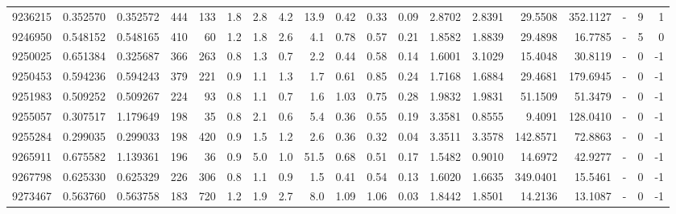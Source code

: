 \begin{tabular}{rrrrrrrrrrrrrrrrlrr}
   9236215 & 0.352570 &   0.352572 &  444 &  133 &      1.8 &      2.8 &     4.2 &     13.9 &       0.42 &        0.33 &        0.09 &  2.8702 &  2.8391 &   29.5508 &  352.1127 &             - &        9 &          1 \\
   9246950 & 0.548152 &   0.548165 &  410 &   60 &      1.2 &      1.8 &     2.6 &      4.1 &       0.78 &        0.57 &        0.21 &  1.8582 &  1.8839 &   29.4898 &   16.7785 &             - &        5 &          0 \\
   9250025 & 0.651384 &   0.325687 &  366 &  263 &      0.8 &      1.3 &     0.7 &      2.2 &       0.44 &        0.58 &        0.14 &  1.6001 &  3.1029 &   15.4048 &   30.8119 &             - &        0 &         -1 \\
   9250453 & 0.594236 &   0.594243 &  379 &  221 &      0.9 &      1.1 &     1.3 &      1.7 &       0.61 &        0.85 &        0.24 &  1.7168 &  1.6884 &   29.4681 &  179.6945 &             - &        0 &         -1 \\
   9251983 & 0.509252 &   0.509267 &  224 &   93 &      0.8 &      1.1 &     0.7 &      1.6 &       1.03 &        0.75 &        0.28 &  1.9832 &  1.9831 &   51.1509 &   51.3479 &             - &        0 &         -1 \\
   9255057 & 0.307517 &   1.179649 &  198 &   35 &      0.8 &      2.1 &     0.6 &      5.4 &       0.36 &        0.55 &        0.19 &  3.3581 &  0.8555 &    9.4091 &  128.0410 &             - &        0 &         -1 \\
   9255284 & 0.299035 &   0.299033 &  198 &  420 &      0.9 &      1.5 &     1.2 &      2.6 &       0.36 &        0.32 &        0.04 &  3.3511 &  3.3578 &  142.8571 &   72.8863 &             - &        0 &         -1 \\
   9265911 & 0.675582 &   1.139361 &  196 &   36 &      0.9 &      5.0 &     1.0 &     51.5 &       0.68 &        0.51 &        0.17 &  1.5482 &  0.9010 &   14.6972 &   42.9277 &             - &        0 &         -1 \\
   9267798 & 0.625330 &   0.625329 &  226 &  306 &      0.8 &      1.1 &     0.9 &      1.5 &       0.41 &        0.54 &        0.13 &  1.6020 &  1.6635 &  349.0401 &   15.5461 &             - &        0 &         -1 \\
   9273467 & 0.563760 &   0.563758 &  183 &  720 &      1.2 &      1.9 &     2.7 &      8.0 &       1.09 &        1.06 &        0.03 &  1.8442 &  1.8501 &   14.2136 &   13.1087 &             - &        0 &         -1 \\

\end{tabular}
